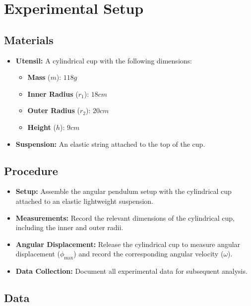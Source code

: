 \chapter{Experimental Setup}

\section{Materials}

\begin{itemize}
    \item{\textbf{Utensil:}} A cylindrical cup with the following dimensions:
    \begin{itemize}
        \item \textbf{Mass} ($m$): $118g$
        \item \textbf{Inner Radius} ($r_1$): $18cm$
        \item \textbf{Outer Radius} ($r_2$): $20cm$
        \item \textbf{Height} ($h$): $9cm$
    \end{itemize}
    \item{\textbf{Suspension:}} An elastic string attached to the top of the cup.
\end{itemize}

\section{Procedure}

\begin{itemize}
    \item{\textbf{Setup:}} Assemble the angular pendulum setup with the cylindrical cup attached to an elastic lightweight suspension.
    \item{\textbf{Measurements:}} Record the relevant dimensions of the cylindrical cup, including the inner and outer radii.
    \item{\textbf{Angular Displacement:}} Release the cylindrical cup to measure angular displacement ($\phi_{\max}$) and record the corresponding angular velocity ($\omega$).
    \item{\textbf{Data Collection:}} Document all experimental data for subsequent analysis.
\end{itemize}

\newpage
\thispagestyle{plain}

\section{Data}

